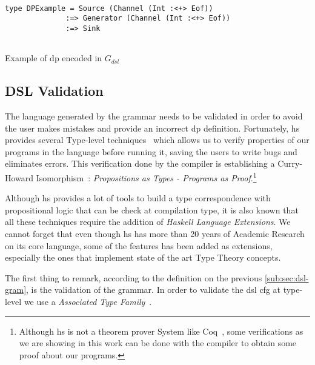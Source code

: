 \begin{listing}[H]
  \begin{verbatim}

type DPExample = Source (Channel (Int :<+> Eof)) 
              :=> Generator (Channel (Int :<+> Eof)) 
              :=> Sink
   
  \end{verbatim}
  \caption{Example of \acrshort{dp} encoded in $G_{dsl}$}
  \label{src:dpfh:3}
\end{listing}

\subsection{DSL Validation}\label{sub:sec:dsl-val}
The language generated by the grammar needs to be validated in order to avoid the user makes mistakes and provide an incorrect \acrshort{dp} definition.
Fortunately, \acrshort{hs} provides several Type-level techniques~\cite{type-haskell} which allows us to verify properties of our programs in the language before running it, 
saving the users to write bugs and eliminates errors. This verification done by the compiler is establishing a Curry-Howard Isomorphism~\cite{curryhoward}: 
\emph{Propositions as Types - Programs as Proof}.\footnote{Although \acrshort{hs} is not a theorem prover System like Coq~\cite{coq}, some verifications as we are showing in this work can be done with the compiler to obtain some proof about our programs.}

Although \acrshort{hs} provides a lot of tools to build a type correspondence with propositional logic that can be check at compilation type, it is also known that all these
techniques require the addition of \emph{Haskell Language Extensions}. We cannot forget that even though \acrshort{hs} has more than 20 years of 
Academic Research on its core language, some of the features has been added as extensions, especially the ones that implement state of the art Type Theory concepts. 

The first thing to remark, according to the definition on the previous \autoref{sub:sec:dsl-gram}, is the validation of the grammar. 
In order to validate the \acrshort{dsl} \acrshort{cfg} at type-level we use a \emph{Associated Type Family}~\cite{associated-types}.


